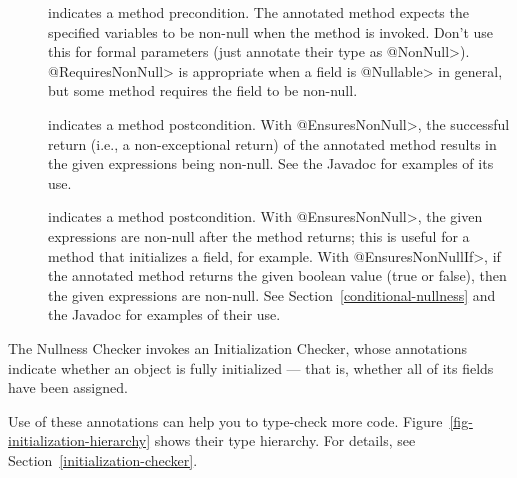 \begin{description}

\item[]
  indicates a method precondition.  The annotated method expects the
  specified variables to be non-null when the
  method is invoked.  Don't use this for formal parameters (just annotate
  their type as \<@NonNull>).  \<@RequiresNonNull> is appropriate when
  a field is \<@Nullable> in general, but some method requires the
  field to be non-null.

\item[]
  indicates a method postcondition.
  With \<@EnsuresNonNull>, the successful return (i.e., a non-exceptional
  return) of the annotated method results in the given expressions being
  non-null. See the Javadoc for examples of its use.
\item[]
  indicates a method postcondition.  With \<@EnsuresNonNull>, the given
  expressions are non-null after the method returns; this is useful for a
  method that initializes a field, for example.  With
  \<@EnsuresNonNullIf>, if the annotated
  method returns the given boolean value (true or false), then the given
  expressions are non-null.  See Section~\ref{conditional-nullness} and the
  Javadoc for examples of their use.

\end{description}



The Nullness Checker invokes an Initialization Checker, whose annotations indicate whether
an object is fully initialized --- that is, whether all of its fields have
been assigned.

\begin{description}
\item[]
\item[]
\item[]
\end{description}

\noindent
Use of these annotations can help you to type-check more
code.  Figure~\ref{fig-initialization-hierarchy} shows their type hierarchy.  For
details, see Section~\ref{initialization-checker}.



